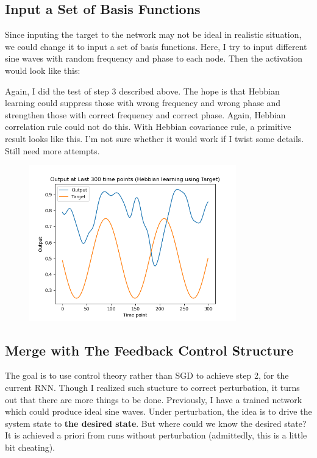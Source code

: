 \documentclass[12pt, a4paper]{article}
\begin{document}
\newpage

\subsection*{Input a Set of Basis Functions}

Since inputing the target to the network may not be ideal in realistic situation, we could change it to input a set of basis functions. Here, I try to input different sine waves with random frequency and phase to each node. Then the activation would look like this:

Again, I did the test of step 3 described above. The hope is that Hebbian learning could suppress those with wrong frequency and wrong phase and strengthen those with correct frequency and correct phase. Again, Hebbian correlation rule could not do this. With Hebbian covariance rule, a primitive result looks like this. I'm not sure whether it would work if I twist some details. Still need more attempts.

\begin{figure}[H]
    \centering
    \includegraphics[width=0.8\textwidth]{RNN/FORCE/fig/FORCE_wavebasis_outputhcp.png} \\
\end{figure}


\newpage

\subsection*{Merge with The Feedback Control Structure}

The goal is to use control theory rather than SGD to achieve step 2, for the current RNN. Though I realized such stucture to correct perturbation, it turns out that there are more things to be done. Previously, I have a trained network which could produce ideal sine waves. Under perturbation, the idea is to drive the system state to \textbf{the desired state}. But where could we know the desired state? It is achieved a priori from runs without perturbation (admittedly, this is a little bit cheating). 
\end{document}
